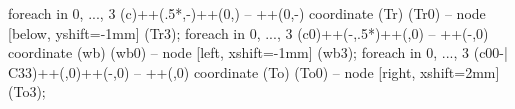 \begin{slide}
\begin{scope}[shift={(p5cl cs:1,4)}, z={(.075,.125)}, font=\footnotesize]
\begin{scope}[xshift=45mm, z={(.6,1)}]
	foreach \x in {0, ..., 3}{
		(c)++(.5*\squaresize,-\baselineskip)++(0,\quantum)
		-- ++(0,-\quantum) coordinate (Tr\x)}
	(Tr0) -- node [below, yshift=-1mm] {\Tr} (Tr3);
	foreach \y in {0, ..., 3}{
		(c0)++(-\baselineskip,.5*\squaresize)++(\quantum,0)
		-- ++(-\quantum,0) coordinate (wb\y)}
	(wb0) -- node [left, xshift=-1mm] {\Twbr} (wb3);
	foreach \z in {0, ..., 3}{
		(c00\z -| C33\z)++(\baselineskip,0)++(-\quantum,0)
		-- ++(\quantum,0) coordinate (To\z)}
	(To0) -- node [right, xshift=2mm] {\To} (To3);

\end{scope}

\end{scope}

\end{slide}
